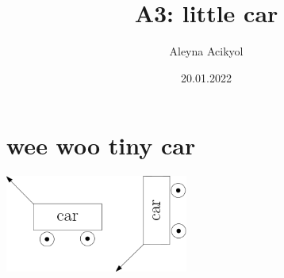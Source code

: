 \documentclass[12pt,fleqn]{article}
\title{A3: little car}
\author{Aleyna Acikyol}
\date{20.01.2022}
\begin{document}
\maketitle
\section*{wee woo tiny car}

\includegraphics[width=6cm]{car.png} 
\end{document}
